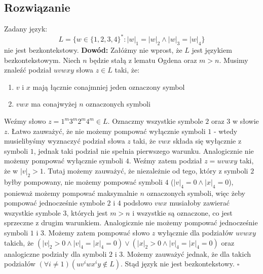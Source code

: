 \documentclass[12pt]{article}
\begin{document}
\subsection*{Rozwiązanie}
    Zadany język:
    $$
    L = \{w \in \{1, 2, 3, 4\}^* : |w|_1 = |w|_2 \land |w|_3 = |w|_4\}
    $$
    \noindent
    nie jest bezkontekstowy.
    \newline\newline
    \textbf{Dowód:}
    \newline
    Załóżmy nie wprost, że $L$ jest językiem bezkontekstowym.
    \newline
    Niech $n$ będzie stałą z lematu Ogdena oraz $m > n$. Musimy znaleźć podział $uvwxy$ słowa $z \in L$ taki, że:
    \begin{enumerate}
        \item $v$ i $x$ mają łącznie conajmniej jeden oznaczony symbol
        \item $vwx$ ma conajwyżej $n$ oznaczonych symboli
    \end{enumerate}
    \noindent
    Weźmy słowo $z = 1^m 3^m 2^m 4^m \in L$. Oznaczmy wszystkie symbole $2$ oraz $3$ w słowie $z$.
    \newline
    Łatwo zauważyć, że nie możemy pompować wyłącznie symboli $1$ - wtedy musielibyśmy wyznaczyć podział słowa $z$ taki, że $vwx$ składa się wyłącznie z symboli $1$, jednak taki podział nie spełnia pierwszego warunku. Analogicznie nie możemy pompować wyłącznie symboli $4$.
    \newline\newline
    Weźmy zatem podział $z = uvwxy$ taki, że w $|v|_2 > 1$. Tutaj możemy zauważyć, że niezależnie od tego, który z symboli $2$ byłby pompowany, nie możemy pompować symboli $4$ ($|v|_4 = 0 \land |x|_4 = 0$), ponieważ możemy pompować maksymalnie $n$ oznaczonych symboli, więc żeby pompować jednocześnie symbole $2$ i $4$ podsłowo $vwx$ musiałoby zawierać wszystkie symbole $3$, których jest $m > n$ i wszystkie są oznaczone, co jest sprzeczne z drugim warunkiem. Analogicznie nie możemy pompować jednocześnie symboli $1$ i $3$.
    \newline\newline
    Możemy zatem pompować słowo $z$ wyłącznie dla podziałów $uvwxy$ takich, że $(|v|_2 > 0 \land |v|_4 = |x|_4 = 0) \lor (|x|_2 > 0 \land |v|_4 = |x|_4 = 0)$ oraz analogiczne podziały dla symboli $2$ i $3$. Możemy zauważyć jednak, że dla takich podziałów $(\forall i \ne 1)(uv^iwx^iy \notin L)$.
    \newline
    Stąd język nie jest bezkontekstowy. $\square$


\newpage
\end{document}
